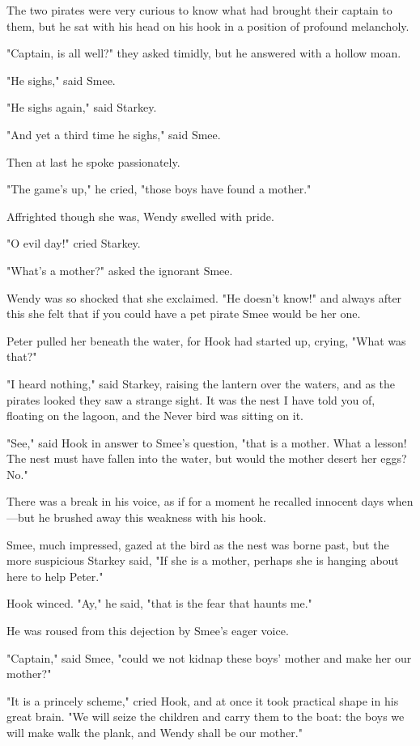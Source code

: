 The two pirates were very curious to know what had brought their captain
to them, but he sat with his head on his hook in a position of profound
melancholy.


"Captain, is all well?" they asked timidly, but he answered with a hollow
moan.


"He sighs," said Smee.


"He sighs again," said Starkey.


"And yet a third time he sighs," said Smee.


Then at last he spoke passionately.


"The game's up," he cried, "those boys have found a mother."


Affrighted though she was, Wendy swelled with pride.


"O evil day!" cried Starkey.


"What's a mother?" asked the ignorant Smee.


Wendy was so shocked that she exclaimed. "He doesn't know!" and always
after this she felt that if you could have a pet pirate Smee would be her
one.


Peter pulled her beneath the water, for Hook had started up, crying, "What
was that?"


"I heard nothing," said Starkey, raising the lantern over the waters, and
as the pirates looked they saw a strange sight. It was the nest I have
told you of, floating on the lagoon, and the Never bird was sitting on it.


"See," said Hook in answer to Smee's question, "that is a mother. What a
lesson! The nest must have fallen into the water, but would the mother
desert her eggs? No."


There was a break in his voice, as if for a moment he recalled innocent
days when—but he brushed away this weakness with his hook.


Smee, much impressed, gazed at the bird as the nest was borne past, but
the more suspicious Starkey said, "If she is a mother, perhaps she is
hanging about here to help Peter."


Hook winced. "Ay," he said, "that is the fear that haunts me."


He was roused from this dejection by Smee's eager voice.


"Captain," said Smee, "could we not kidnap these boys' mother and make her
our mother?"


"It is a princely scheme," cried Hook, and at once it took practical shape
in his great brain. "We will seize the children and carry them to the
boat: the boys we will make walk the plank, and Wendy shall be our
mother."


